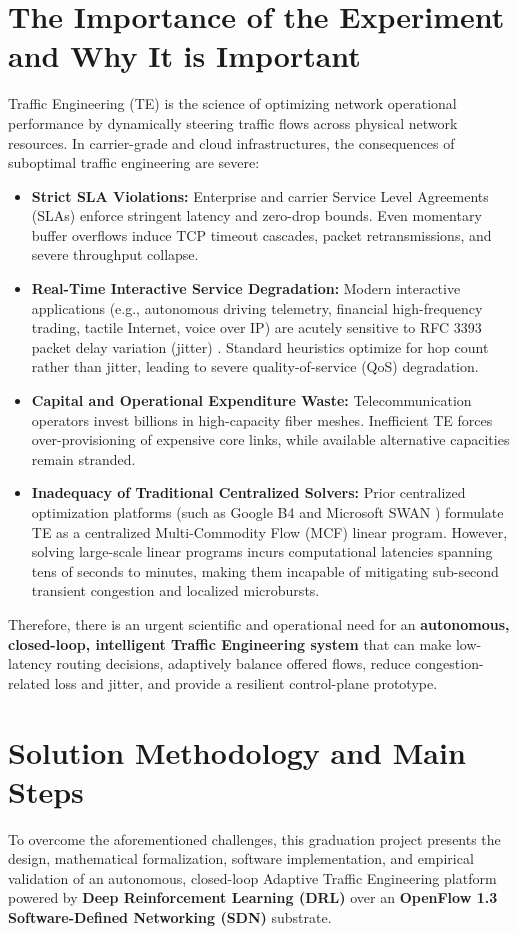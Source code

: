 \documentclass[12pt,a4paper,oneside]{report}
\begin{document}
\section{The Importance of the Experiment and Why It is Important}
Traffic Engineering (TE) is the science of optimizing network operational performance by dynamically steering traffic flows across physical network resources. In carrier-grade and cloud infrastructures, the consequences of suboptimal traffic engineering are severe:
\begin{itemize}
    \item \textbf{Strict SLA Violations:} Enterprise and carrier Service Level Agreements (SLAs) enforce stringent latency and zero-drop bounds. Even momentary buffer overflows induce TCP timeout cascades, packet retransmissions, and severe throughput collapse.
    \item \textbf{Real-Time Interactive Service Degradation:} Modern interactive applications (e.g., autonomous driving telemetry, financial high-frequency trading, tactile Internet, voice over IP) are acutely sensitive to RFC 3393 packet delay variation (jitter) \cite{deroo2002ip}. Standard heuristics optimize for hop count rather than jitter, leading to severe quality-of-service (QoS) degradation.
    \item \textbf{Capital and Operational Expenditure Waste:} Telecommunication operators invest billions in high-capacity fiber meshes. Inefficient TE forces over-provisioning of expensive core links, while available alternative capacities remain stranded.
    \item \textbf{Inadequacy of Traditional Centralized Solvers:} Prior centralized optimization platforms (such as Google B4 \cite{jain2013b4} and Microsoft SWAN \cite{hong2013achieving}) formulate TE as a centralized Multi-Commodity Flow (MCF) linear program. However, solving large-scale linear programs incurs computational latencies spanning tens of seconds to minutes, making them incapable of mitigating sub-second transient congestion and localized microbursts.
\end{itemize}

Therefore, there is an urgent scientific and operational need for an \textbf{autonomous, closed-loop, intelligent Traffic Engineering system} that can make low-latency routing decisions, adaptively balance offered flows, reduce congestion-related loss and jitter, and provide a resilient control-plane prototype.

\section{Solution Methodology and Main Steps}
To overcome the aforementioned challenges, this graduation project presents the design, mathematical formalization, software implementation, and empirical validation of an autonomous, closed-loop Adaptive Traffic Engineering platform powered by \textbf{Deep Reinforcement Learning (DRL)} over an \textbf{OpenFlow 1.3 Software-Defined Networking (SDN)} substrate.
\end{document}
